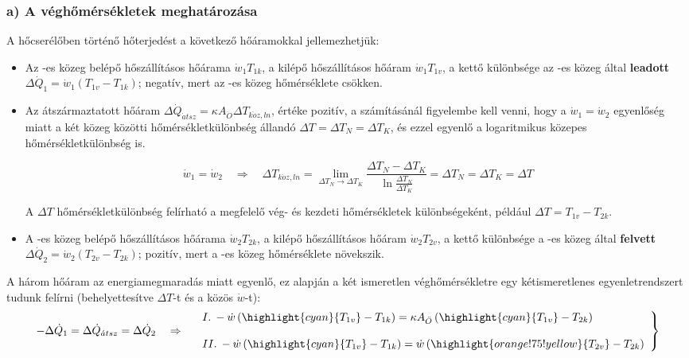 \subsubsection*{a) A véghőmérsékletek meghatározása}
A hőcserélőben történő hőterjedést a következő hőáramokkal jellemezhetjük:
\begin{itemize}
	\setlength\itemsep{0em}
	\item Az -es közeg belépő hőszállításos hőárama $\dot{w}_1 T_{1k}$, a kilépő hőszállításos hőáram $\dot{w}_1 T_{1v}$, a kettő különbsége az -es közeg által \textbf{leadott} $\Delta \dot{Q}_1 = \dot{w}_1 \left(T_{1v} - T_{1k}\right)$; negatív, mert az -es közeg hőmérséklete csökken.
	\item Az átszármaztatott hőáram $\Delta \dot{Q}_{\acute{a}tsz} = \kappa A_{\ddot{O}} \Delta T_{k\ddot{o}z,ln}$, értéke pozitív, a számításánál figyelembe kell venni, hogy a $\dot{w}_1 = \dot{w}_2$ egyenlőség miatt a két közeg közötti hőmérsékletkülönbség állandó $\Delta T = \Delta T_N = \Delta T_K$, és ezzel egyenlő a logaritmikus közepes hőmérsékletkülönbség is.
	
	\begin{equation}
		\dot{w}_1 = \dot{w}_2 \quad \Rightarrow \quad \Delta T_{k\ddot{o}z,ln} = \lim_{\Delta T_N \to \Delta T_K} \dfrac{\Delta T_N - \Delta T_K}{\ln\frac{\Delta T_N}{\Delta T_K}} = \Delta T_N = \Delta T_K = \Delta T
	\end{equation}
	
	A $\Delta T$ hőmérsékletkülönbség felírható a megfelelő vég- és kezdeti hőmérsékletek különbségeként, például $\Delta T = T_{1v} - T_{2k}$.
	
	\item A -es közeg belépő hőszállításos hőárama $\dot{w}_2 T_{2k}$, a kilépő hőszállításos hőáram $\dot{w}_2 T_{2v}$, a kettő különbsége a -es közeg által \textbf{felvett} $\Delta \dot{Q}_2 = \dot{w}_2 \left(T_{2v} - T_{2k}\right)$; pozitív, mert a -es közeg hőmérséklete növekszik.
\end{itemize}

A három hőáram az energiamegmaradás miatt egyenlő, ez alapján a két ismeretlen véghőmérsékletre egy kétismeretlenes egyenletrendszert tudunk felírni (behelyettesítve $\Delta T$-t és a közös $\dot{w}$-t):
\begin{equation}
	-\Delta \dot{Q}_1 = \Delta \dot{Q}_{\acute{a}tsz} = \Delta \dot{Q}_2
	\quad \Rightarrow \quad 
	\left.
		\begin{array}{l}
			I.\: -\dot{w} \left(\highlight{cyan}{T_{1v}} - T_{1k}\right) 
			= 
			\kappa A_{\ddot{O}} \left(\highlight{cyan}{T_{1v}} - T_{2k}\right) \\ \\
			II.\: -\dot{w} \left(\highlight{cyan}{T_{1v}} - T_{1k}\right) 
			= 
			\dot{w} \left(\highlight{orange!75!yellow}{T_{2v}} - T_{2k}\right)
		\end{array}
	\right\rbrace
\end{equation}

